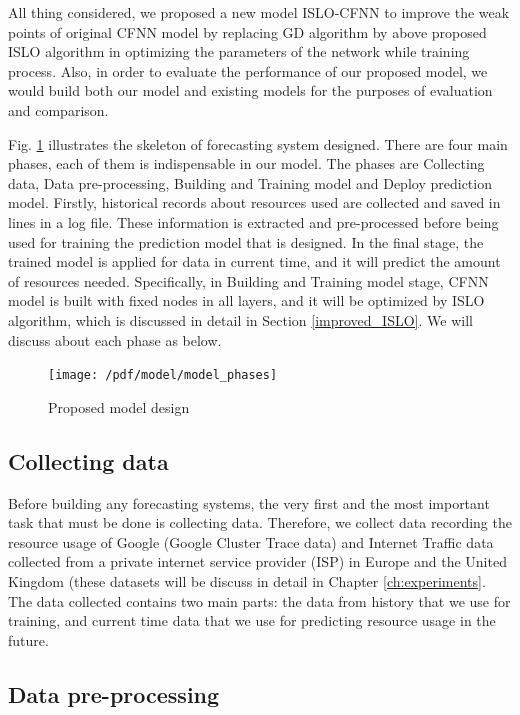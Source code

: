 \documentclass[a4paper,13pt,2p]{report}
\begin{document}
	All thing considered, we proposed a new model ISLO-CFNN to improve the weak points of original CFNN model by replacing GD algorithm by above proposed ISLO algorithm in optimizing the parameters of the network while training process. Also, in order to evaluate the performance of our proposed model, we would build both our model and existing models for the purposes of evaluation and comparison.
	
	Fig. \ref{fig_model_phases} illustrates the skeleton of forecasting system designed. There are four main phases, each of them is indispensable in our model. The phases are Collecting data, Data pre-processing, Building and Training model and Deploy prediction model. Firstly, historical records about resources used are collected and saved in lines in a log file. These information is extracted and pre-processed before being used for training the prediction model that is designed. In the final stage, the trained model is applied for data in current time, and it will predict the amount of resources needed. Specifically, in Building and Training model stage, CFNN model is built with fixed nodes in all layers, and it will be optimized by ISLO algorithm, which is discussed in detail in Section \ref{improved_ISLO}. We will discuss about each phase as below.
	
\begin{figure}[!ht] 
   \centering
   \texttt{[image: /pdf/model/model\_phases]}
  \caption{Proposed model design} 
  \label{fig_model_phases} 
\end{figure}
	
\subsection{Collecting data}
\label{collect_data}
	
	Before building any forecasting systems, the very first and the most important task that must be done is collecting data. Therefore, we collect data recording the resource usage of Google (Google Cluster Trace data) and Internet Traffic data collected from a private internet service provider (ISP) in Europe and the United Kingdom (these datasets  will be discuss in detail in Chapter \ref{ch:experiments}. The data collected contains two main parts: the data from history that we use for training, and current time data that we use for predicting resource usage in the future.  
	

\subsection{Data pre-processing}
\label{data-pre}
\end{document}
